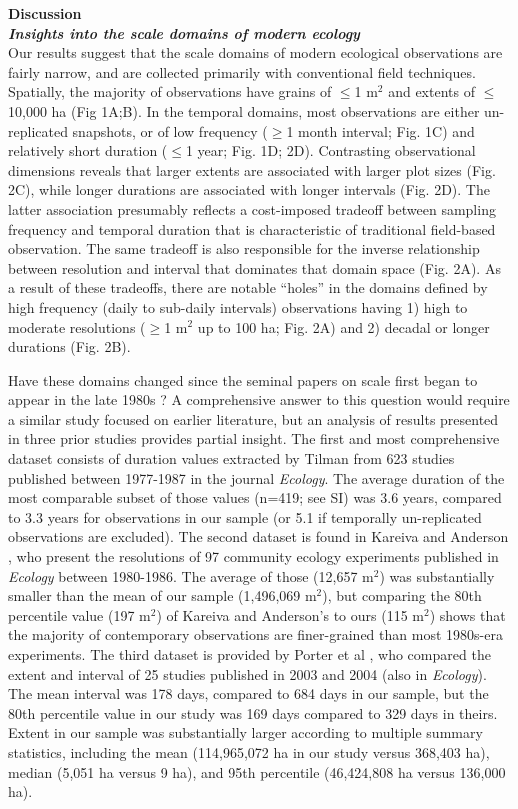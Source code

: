 \documentclass[12pt]{article}
\begin{document}
\noindent \textbf{Discussion}\\
\noindent \textbf{\emph{Insights into the scale domains of modern ecology}}\\
Our results suggest that the scale domains of modern ecological observations are fairly narrow, and are collected primarily with conventional field techniques. Spatially, the majority of observations have grains of $\leq$1 m$^2$ and extents of $\leq$10,000 ha (Fig 1A;B). In the temporal domains, most observations are either un-replicated snapshots, or of low frequency ($\geq$1 month interval; Fig. 1C) and relatively short duration ($\leq$1 year; Fig. 1D; 2D). Contrasting observational dimensions reveals that larger extents are associated with larger plot sizes (Fig. 2C), while longer durations are associated with longer intervals (Fig. 2D). The latter association presumably reflects a cost-imposed tradeoff between sampling frequency and temporal duration that is characteristic of traditional field-based observation. The same tradeoff is also responsible for the inverse relationship between resolution and interval that dominates that domain space (Fig. 2A). As a result of these tradeoffs, there are notable ``holes'' in the domains defined by high frequency (daily to sub-daily intervals) observations having 1) high to moderate resolutions ($\geq$1 m$^2$ up to 100 ha; Fig. 2A) and 2) decadal or longer durations (Fig. 2B).  

Have these domains changed since the seminal papers on scale first began to appear in the late 1980s \cite{wiens_spatial_1989, levin_problem_1992, tilman_ecological_1989}? A comprehensive answer to this question would require a similar study focused on earlier literature, but an analysis of results presented in three prior studies provides partial insight. The first and most comprehensive dataset consists of duration values extracted by Tilman \cite{tilman_ecological_1989} from 623 studies published between 1977-1987 in the journal \emph{Ecology}. The average duration of the most comparable subset of those values (n=419; see SI) was 3.6 years, compared to 3.3 years for observations in our sample (or 5.1 if temporally un-replicated observations are excluded). The second dataset is found in Kareiva and Anderson \cite{kareiva_spatial_1988}, who present the resolutions of 97 community ecology experiments published in \emph{Ecology} between 1980-1986. The average of those (12,657 m$^2$) was substantially smaller than the mean of our sample (1,496,069 m$^2$), but comparing the 80th percentile value (197 m$^2$) of Kareiva and Anderson's \cite{kareiva_spatial_1988} to ours (115 m$^2$) shows that the majority of contemporary observations are finer-grained than most 1980s-era experiments. The third dataset is provided by Porter et al \cite{porter_wireless_2005}, who compared the extent and interval of 25 studies published in 2003 and 2004 (also in \emph{Ecology}). The mean interval was 178 days, compared to 684 days in our sample, but the 80th percentile value in our study was 169 days compared to 329 days in theirs. Extent in our sample was substantially larger according to multiple summary statistics, including the mean (114,965,072 ha in our study versus 368,403 ha), median (5,051 ha versus 9 ha), and 95th percentile (46,424,808 ha versus 136,000 ha).  
\end{document}
